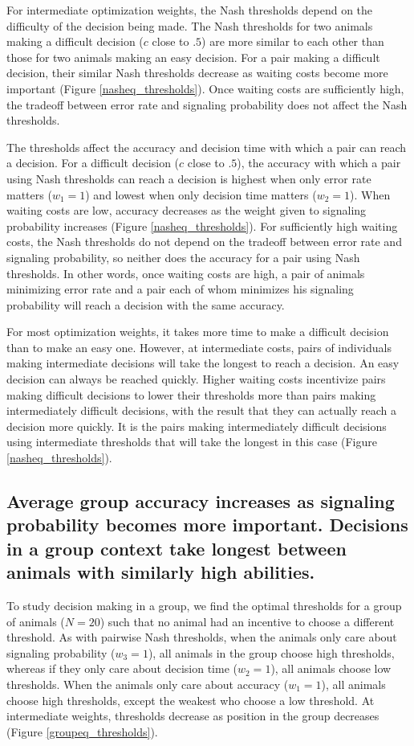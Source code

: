 \documentclass{article}
\begin{document}
For intermediate optimization weights, the Nash  thresholds depend on the difficulty of the decision being made.  The Nash thresholds for two animals making a difficult decision ($c$ close to $.5$) are more similar to each other than those for two animals making an easy decision.  For a pair making a difficult decision, their similar Nash thresholds decrease as waiting costs become more important (Figure \ref{nasheq_thresholds}).  Once waiting costs are sufficiently high, the tradeoff between error rate and signaling probability does not affect the Nash thresholds.

The thresholds affect the accuracy and decision time with which a pair can reach a decision.  For a difficult decision ($c$ close to $.5$), the accuracy with which a pair using Nash thresholds can reach a decision is highest when only error rate matters ($w_1=1$) and lowest when only decision time matters ($w_2=1$).  When waiting costs are low, accuracy decreases as the weight given to signaling probability increases (Figure \ref{nasheq_thresholds}).  For sufficiently high waiting costs, the Nash thresholds do not depend on the tradeoff between error rate and signaling probability, so neither does the accuracy for a pair using Nash thresholds.  In other words, once waiting costs are high, a pair of animals minimizing error rate and a pair each of whom minimizes his signaling probability will reach a decision with the same accuracy.

For most optimization weights, it takes more time to make a difficult decision than to make an easy one.  However, at intermediate costs, pairs of individuals making intermediate decisions will take the longest to reach a decision.  An easy decision can always be reached quickly.  Higher waiting costs incentivize pairs making difficult decisions to lower their thresholds more than pairs making intermediately difficult decisions, with the result that they can actually reach a decision more quickly.  It is the pairs making intermediately difficult decisions using intermediate thresholds that will take the longest in this case (Figure \ref{nasheq_thresholds}). 


\subsection{Average group accuracy increases as signaling probability becomes more important. Decisions in a group context take longest between animals with similarly high abilities. }

To study decision making in a group, we find the optimal thresholds for a group of animals ($N=20$) such that no animal had an incentive to choose a different threshold.  As with pairwise Nash thresholds, when the animals only care about signaling probability ($w_3=1$), all animals in the group choose high thresholds, whereas if they only care about decision time ($w_2=1$), all animals choose low thresholds.  When the animals only care about accuracy ($w_1=1$), all animals choose high thresholds, except the weakest who choose a low threshold.  At intermediate weights, thresholds decrease as position in the group decreases (Figure \ref{groupeq_thresholds}). 
\end{document}
